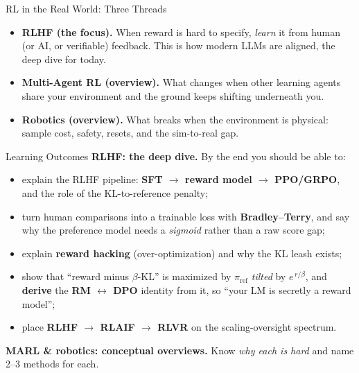 \begin{frame}{RL in the Real World: Three Threads}
\begin{itemize}\itemsep0.6em
    \item \textbf{RLHF (the focus).} When reward is hard to specify, \emph{learn}
          it from human (or AI, or verifiable) feedback. This is how modern
          LLMs are aligned, the deep dive for today.
    \item \textbf{Multi-Agent RL (overview).} What changes when other learning
          agents share your environment and the ground keeps shifting underneath
          you.
    \item \textbf{Robotics (overview).} What breaks when the environment is
          physical: sample cost, safety, resets, and the sim-to-real gap.
\end{itemize}
\end{frame}

\begin{frame}{Learning Outcomes}
\textbf{RLHF: the deep dive.} By the end you should be able to:
\begin{itemize}\itemsep0.2em\small
    \item explain the RLHF pipeline: \textbf{SFT $\rightarrow$ reward model
          $\rightarrow$ PPO/GRPO}, and the role of the KL-to-reference penalty;
    \item turn human comparisons into a trainable loss with \textbf{Bradley--Terry},
          and say why the preference model needs a \emph{sigmoid} rather than a raw
          score gap;
    \item explain \textbf{reward hacking} (over-optimization) and why the KL leash
          exists;
    \item show that ``reward minus $\beta$-KL'' is maximized by $\pi_{\text{ref}}$
          \emph{tilted} by $e^{\,r/\beta}$, and \textbf{derive} the
          \textbf{RM $\leftrightarrow$ DPO} identity from it, so ``your LM is
          secretly a reward model'';
    \item place \textbf{RLHF $\rightarrow$ RLAIF $\rightarrow$ RLVR} on the
          scaling-oversight spectrum.
\end{itemize}
\vspace{0.5em}
\textbf{MARL \& robotics: conceptual overviews.} Know \emph{why each is hard}
and name 2--3 methods for each.
\end{frame}
